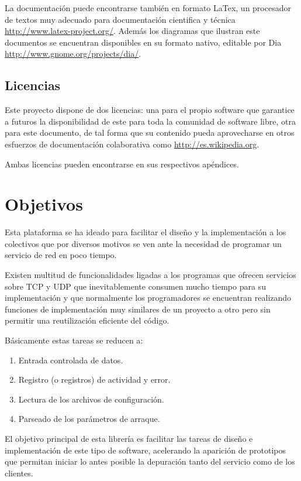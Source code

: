 \documentclass[a4paper,spanish,12pt]{book}
\begin{document}
La documentación puede encontrarse también en formato LaTex, un procesador de textos muy adecuado para documentación cientifica y técnica \url{http://www.latex-project.org/}. Además los diagramas que ilustran este documentos se encuentran disponibles en su formato nativo, editable por Dia \url{http://www.gnome.org/projects/dia/}.
\section{Licencias}
Este proyecto dispone de dos licencias: una para el propio software que garantice a futuros la disponibilidad de este para toda la comunidad de software libre, otra para este documento, de tal forma que su contenido pueda aprovecharse en otros esfuerzos de documentación colaborativa como \url{http://es.wikipedia.org}.

Ambas licencias pueden encontrarse en sus respectivos ap\'endices.
\chapter{Objetivos}

Esta plataforma se ha ideado para facilitar el diseño y la implementación a los colectivos que por diversos motivos se ven ante la necesidad de programar un servicio de red en poco tiempo. 

Existen multitud de funcionalidades ligadas a los programas que ofrecen servicios sobre TCP y UDP que inevitablemente consumen mucho tiempo para su implementación y que normalmente los programadores se encuentran realizando funciones de implementación muy similares de un proyecto a otro pero sin permitir una reutilización eficiente del código.

Básicamente estas tareas se reducen a:
\begin{enumerate}
	\item Entrada controlada de datos.
	\item Registro (o registros) de actividad y error.
	\item Lectura de los archivos de configuraci\'on.
	\item Parseado de los parámetros de arraque.
\end{enumerate}

El objetivo principal de esta librería es facilitar las tareas de diseño e implementación de este tipo de software, acelerando la aparición de prototipos que permitan iniciar lo antes posible la depuración tanto del servicio como de los clientes.
\end{document}

